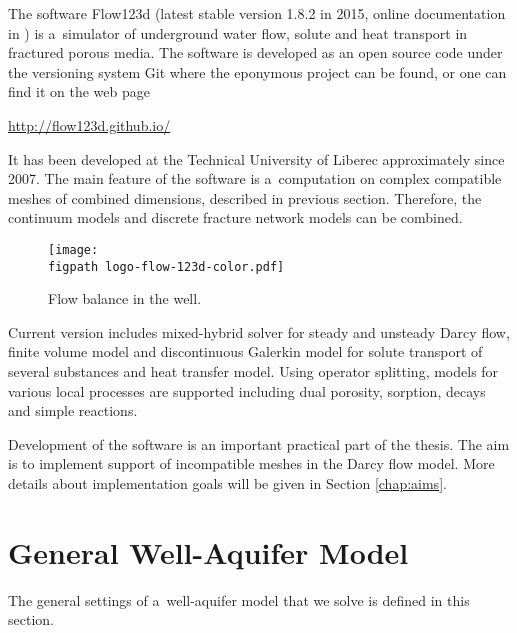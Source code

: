 The software Flow123d (latest stable version 1.8.2 in 2015, online documentation in \cite{flow123d_doc_2015}) 
is a~simulator of underground water flow, solute and heat transport in fractured porous media. The software is
developed as an open source code under the versioning system Git where the eponymous project can be found, or 
one can find it on the web page
\begin{center}
\url{http://flow123d.github.io/}
\end{center}
It has been developed at the Technical University of Liberec approximately since 2007.
The main feature of the software is a~computation on complex compatible meshes of combined dimensions, described in
previous section. Therefore, the continuum models and discrete fracture network models can be combined.
%
\begin{figure}[!htb]
  \centering
  \texttt{[image: \\figpath logo-flow-123d-color.pdf]}
  \caption{Flow balance in the well.}
  \label{fig:logo_flow123d}
\end{figure}
%
Current version includes mixed-hybrid solver for steady and unsteady Darcy flow, finite volume model 
and discontinuous Galerkin model for solute transport of several substances and heat transfer model. 
Using operator splitting, models for various local processes are supported including dual porosity, sorption, decays 
and simple reactions.


Development of the software is an important practical part of the thesis. The aim is to implement support 
of incompatible meshes in the Darcy flow model. More details about implementation goals will be given in
Section \ref{chap:aims}.


\newpage
\section{General Well-Aquifer Model}
The general settings of a~well-aquifer model that we solve is defined in this section.

